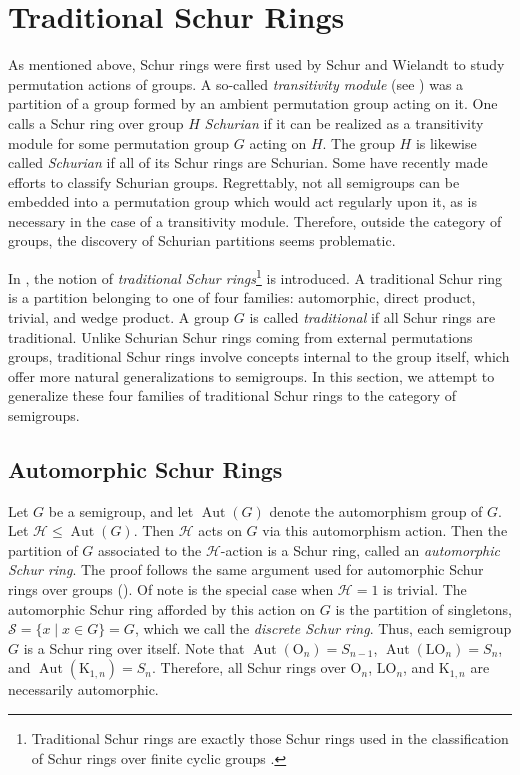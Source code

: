 \documentclass{article}
\theoremstyle{plain}
\theoremstyle{definition}
\renewcommand{\S}{\mathcal{S}}
\renewcommand{\H}{\mathscr{H}}
\renewcommand{\O}{\mathrm{O}}
\newcommand{\K}{\mathrm{K}}
\newcommand{\LO}{\mathrm{LO}}
\DeclareMathOperator*{\Aut}{Aut}
\begin{document}
\section{Traditional Schur Rings}\label{sec:trad}
As mentioned above, Schur rings were first used by Schur and Wielandt to study permutation actions of groups. A so-called \emph{transitivity module} (see \cite{Wielandt64}) was a partition of a group formed by an ambient permutation group acting on it. One calls a Schur ring over group $H$ \emph{Schurian} if it can be realized as a transitivity module for some permutation group $G$ acting on $H$. The group $H$ is likewise called \emph{Schurian} if all of its Schur rings are Schurian. Some \cite{Ponomarenko2022, Muzychuk2016, Muzychuk09, Ryabov2015, Ryabov2022,  Ryabov2023} have recently made efforts to classify Schurian groups. Regrettably, not all semigroups can be embedded into a permutation group which would act regularly upon it, as is necessary in the case of a transitivity module. Therefore, outside the category of groups, the discovery of Schurian partitions seems problematic.

In \cite{InfiniteI}, the notion of \emph{traditional Schur rings}\footnote{Traditional Schur rings are exactly those Schur rings used in the classification of Schur rings over finite cyclic groups \cite{LeungII, LeungI}.} is introduced. A traditional Schur ring is a partition belonging to one of four families: automorphic, direct product, trivial, and wedge product. A group $G$ is called \emph{traditional} if all Schur rings are traditional. Unlike Schurian Schur rings coming from external permutations groups, traditional Schur rings involve concepts internal to the group itself, which offer more natural generalizations to semigroups. In this section, we attempt to generalize these four families of traditional Schur rings to the category of semigroups.  

\subsection{Automorphic Schur Rings}\label{sec:auto}

Let $G$ be a semigroup, and let $\Aut(G)$ denote the automorphism group of $G$. Let $\H\le \Aut(G)$. Then $\H$ acts on $G$ via this automorphism action. Then the partition of $G$ associated to the $\H$-action is a Schur ring, called an \emph{automorphic Schur ring}. The proof follows the same argument used for automorphic Schur rings over groups (\cite[see Example 2.20]{MePhD}). Of note is the special case when $\H=1$ is trivial. The automorphic Schur ring afforded by this action on $G$ is the partition of singletons, $\S = \{x\mid x\in G\} = G$, which we call the \emph{discrete Schur ring}. Thus, each semigroup $G$ is a Schur ring over itself. Note that $\Aut(\O_n) = S_{n-1}$, $\Aut(\LO_n)=S_n$, and $\Aut(\K_{1,n})=S_n$. Therefore, all Schur rings over $\O_n$, $\LO_n$, and $\K_{1,n}$ are necessarily automorphic.%
\end{document}
